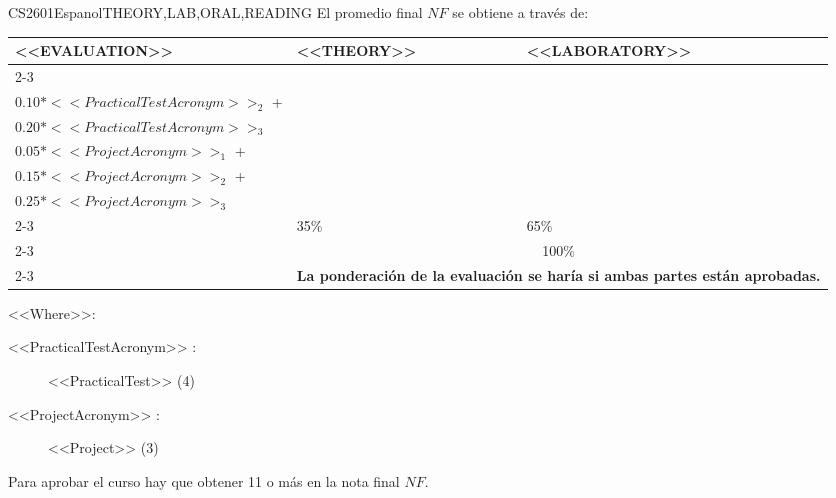     
\begin{evaluation}{CS2601}{Espanol}{THEORY,LAB,ORAL,READING}
  El promedio final $NF$ se obtiene a través de:
 
  \begin{tabularx}{0.9\textwidth}{|X|p{}|p{}|} \hline
  \multirow{4}{*}{\uppercase{<<Evaluation>>}} & \uppercase{<<Theory>>} & \uppercase{<<Laboratory>>} \\ \cline{2-3}
  & %
      \begin{minipage}{0.95\textwidth}
      \begin{tabular}{l}
          $0.05*<<PracticalTestAcronym>>_{1}$  + \\
          $0.10*<<PracticalTestAcronym>>_{2}$  + \\
          $0.20*<<PracticalTestAcronym>>_{3}$
      \end{tabular} 
      \end{minipage} 
  & %
      \begin{minipage}{0.95\textwidth}
      \begin{tabular}{l}
          $0.20*<<PracticalTestAcronym>>_{4}$  + \\
          $0.05*<<ProjectAcronym>>_{1}$  + \\
          $0.15*<<ProjectAcronym>>_{2}$  + \\
          $0.25*<<ProjectAcronym>>_{3}$
      \end{tabular} 
      \end{minipage}                 \\ \cline{2-3}
  
  & %
  35\% 
  & %
  65\% \\ \cline{2-3}
  & \multicolumn{2}{c|}{100\%}  \\ \cline{2-3}
  & \multicolumn{2}{c|}{\textbf{La ponderación de la evaluación se haría si ambas partes están aprobadas.}}  \\ \hline
  \end{tabularx}
    
  \vspace{2mm}
  \noindent <<Where>>:
  \begin{description}
      \item[<<PracticalTestAcronym>> :] <<PracticalTest>>  (4)
      \item[<<ProjectAcronym>> :] <<Project>> (3)
  \end{description}
  
  \noindent Para aprobar el curso hay que obtener 11 o más en la nota final $NF$.
  \end{evaluation}
 
